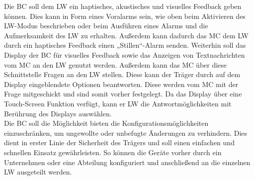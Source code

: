 \documentclass[thesis.tex]{subfiles}
\begin{document}
Die BC soll dem LW ein haptisches, akustisches und visuelles Feedback geben können.
Dies kann in Form eines Voralarms sein, wie oben beim Aktivieren des LW-Modus beschrieben oder beim Ausführen eines Alarms
und die Aufmerksamkeit des LW zu erhalten.
Außerdem kann dadurch das MC dem LW durch ein haptisches Feedback einen „Stillen“-Alarm senden.
Weiterhin soll das Display der BC für visuelles Feedback sowie das Anzeigen von Textnachrichten vom MC an den LW genutzt werden.
Außerdem kann das MC über diese Schnittstelle Fragen an den LW stellen.
Diese kann der Träger durch auf dem Display eingeblendete Optionen beantworten.
Diese werden vom MC mit der Frage mitgeschickt und sind somit vorher festgelegt.
Da das Display über eine Touch-Screen Funktion verfügt, kann er LW die Antwortmöglichkeiten mit Berührung des Displays auswählen.
\\

Die BC soll die Möglichkeit bieten die Konfigurationsmöglichkeiten einzuschränken, um ungewollte oder unbefugte Änderungen zu verhindern.
Dies dient in erster Linie der Sicherheit des Trägers und soll einen einfachen und schnellen Einsatz gewährleisten.
So können die Geräte vorher durch ein Unternehmen oder eine Abteilung konfiguriert und anschließend an die einzelnen LW ausgeteilt werden.
\\


\subfilebib %
\end{document}
